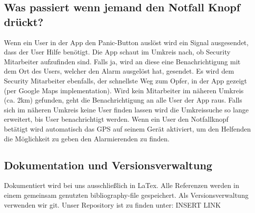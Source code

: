 \documentclass{article}
\begin{document}
\subsection{Was passiert wenn jemand den Notfall Knopf drückt?}
Wenn ein User in der App den Panic-Button auslöst wird ein Signal ausgesendet, dass der User Hilfe benötigt. 
Die App schaut im Umkreis nach, ob Security Mitarbeiter aufzufinden sind. 
Falls ja, wird an diese eine Benachrichtigung mit dem Ort des Users, welcher den Alarm ausgelöst hat, gesendet. 
Es wird dem Security Mitarbeiter ebenfalls, der schnellste Weg zum Opfer, in der App gezeigt (per Google Maps implementation). 
Wird kein Mitarbeiter im näheren Umkreis (ca. 2km) gefunden, geht die Benachrichtigung an alle User der App raus. Falls sich im näheren Umkreis keine User finden lassen wird die Umkreissuche so lange erweitert, bis User benachrichtigt werden. 
Wenn ein User den Notfallknopf betätigt wird automatisch das GPS auf seinem Gerät aktiviert, um den Helfenden die Möglichkeit zu geben den Alarmierenden zu finden.
\subsection{Dokumentation und Versionsverwaltung}
Dokumentiert wird bei uns ausschließlich in LaTex. 
Alle Referenzen werden in einem gemeinsam genutzten bibliography-file gespeichert.
Als Versionsverwaltung verwenden wir git. Unser Repository ist zu finden unter: INSERT LINK
\end{document}
